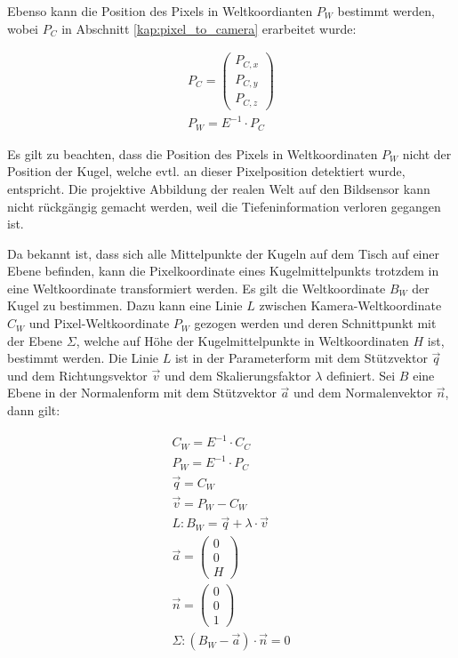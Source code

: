 Ebenso kann die Position des Pixels in Weltkoordianten $P_W$ bestimmt werden, wobei $P_C$
in Abschnitt \ref{kap:pixel_to_camera} erarbeitet wurde:

\begin{align}
P_C = \begin{pmatrix}P_{C,x}\\P_{C,y}\\P_{C,z}\end{pmatrix}\\
P_W = E^{-1} \cdot P_C
\end{align}

Es gilt zu beachten, dass die Position des Pixels in Weltkoordinaten $P_W$ nicht der Position der Kugel, welche evtl. an
dieser Pixelposition detektiert wurde, entspricht. Die projektive Abbildung der realen Welt auf den Bildsensor kann
nicht rückgängig gemacht werden, weil die Tiefeninformation verloren gegangen ist.

Da bekannt ist, dass sich alle Mittelpunkte der Kugeln auf dem Tisch auf einer Ebene befinden, kann die Pixelkoordinate
eines Kugelmittelpunkts trotzdem in eine Weltkoordinate transformiert werden.
Es gilt die Weltkoordinate $B_W$ der Kugel zu bestimmen.
Dazu kann eine Linie $L$ zwischen Kamera-Weltkoordinate $C_W$ und Pixel-Weltkoordinate $P_W$ gezogen werden und deren
Schnittpunkt mit der Ebene $\Sigma$, welche auf Höhe der Kugelmittelpunkte in Weltkoordinaten $H$ ist, bestimmt werden.
Die Linie $L$ ist in der Parameterform mit dem Stützvektor $\vec{q}$ und dem Richtungsvektor $\vec{v}$ und dem Skalierungsfaktor $\lambda$ definiert.
Sei $B$ eine Ebene in der Normalenform mit dem Stützvektor $\vec{a}$ und dem Normalenvektor $\vec{n}$, dann gilt:

\begin{align}
C_W = E^{-1} \cdot C_C\\
P_W = E^{-1} \cdot P_C\\
\vec{q} = C_W\\
\vec{v} = P_W - C_W\\
L: B_W = \vec{q} + \lambda \cdot \vec{v}\\
\vec{a} = \begin{pmatrix}0\\0\\H\end{pmatrix}\\
\vec{n} = \begin{pmatrix}0\\0\\1\end{pmatrix}\\
\Sigma: (B_W - \vec{a}) \cdot \vec{n} = 0\\
\end{align}

